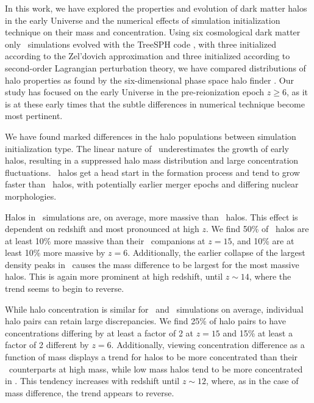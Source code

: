 
%
%
%
%


In this work, we have explored the properties and evolution of dark matter halos in the early Universe and the numerical effects of simulation initialization technique on their mass and concentration.  Using six cosmological dark matter only \nbody\ simulations evolved with the TreeSPH code \gadgettwo, with three initialized according to the Zel'dovich approximation and three initialized according to second-order Lagrangian perturbation theory, we have compared distributions of halo properties as found by the six-dimensional phase space halo finder \rockstar.  Our study has focused on the early Universe in the pre-reionization epoch $z \ge 6$, as it is at these early times that the subtle differences in numerical technique become most pertinent.

We have found marked differences in the halo populations between simulation initialization type.  The linear nature of \za\ underestimates the growth of early halos, resulting in a suppressed halo mass distribution and large concentration fluctuations.  \lpt\ halos get a head start in the formation process and tend to grow faster than \za\ halos, with potentially earlier merger epochs and differing nuclear morphologies.

Halos in \lpt\ simulations are, on average, more massive than \za\ halos.  This effect is dependent on redshift and most pronounced at high $z$.  We find 50\% of \lpt\ halos are at least 10\% more massive than their \za\ companions at $z = 15$, and 10\% are at least 10\% more massive by $z = 6$.  Additionally, the earlier collapse of the largest density peaks in \lpt\ causes the mass difference to be largest for the most massive halos.  This is again more prominent at high redshift, until $z \sim 14$, where the trend seems to begin to reverse.

While halo concentration is similar for \za\ and \lpt\ simulations on average, individual halo pairs can retain large discrepancies.  We find 25\% of halo pairs to have concentrations differing by at least a factor of 2 at $z = 15$ and 15\% at least a factor of 2 different by $z = 6$.  Additionally, viewing concentration difference as a function of mass displays a trend for \za halos to be more concentrated than their \lpt\ counterparts at high mass, while low mass halos tend to be more concentrated in \lpt.  This tendency increases with redshift until $z \sim 12$, where, as in the case of mass difference, the trend appears to reverse.

